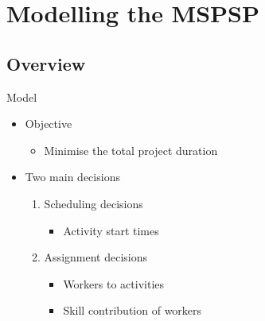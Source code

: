 \documentclass{beamer}
\begin{document}
\section{Modelling the MSPSP}
\subsection{Overview}
\begin{frame}{Model}
	\begin{itemize}
		\item Objective
		\begin{itemize}
			\item Minimise the total project duration\pause
		\end{itemize}
	\end{itemize}
	\vspace{5mm}
	\begin{itemize}
		\item Two main decisions\pause
		\vspace{2mm}
		\begin{enumerate}
			\item Scheduling decisions
			\begin{itemize}
				\item Activity start times\pause
			\end{itemize}
			\vspace{2mm}
			\item Assignment decisions
			\begin{itemize}
				\item Workers to activities
				\vspace{1mm}
				\item Skill contribution of workers
			\end{itemize}
		\end{enumerate}
	\end{itemize}
\end{frame}
\end{document}
